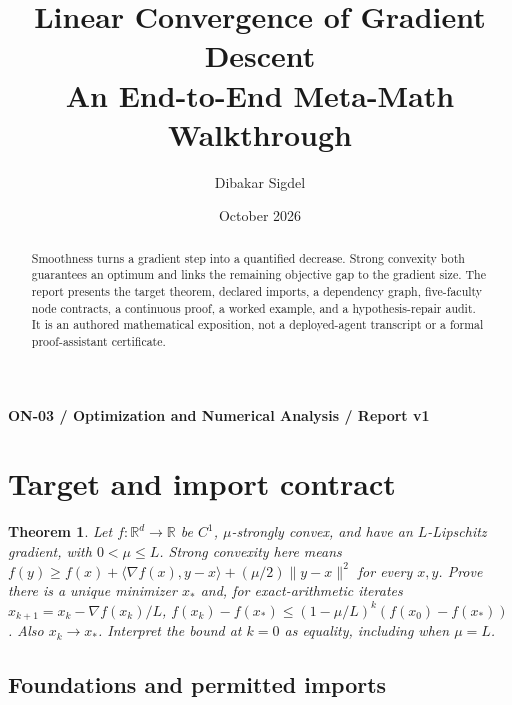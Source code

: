 \documentclass[preprint,12pt,aps,pra,showkeys,amsmath,amssymb,superscriptaddress,floatfix]{revtex4-2}
\newtheorem{theorem}{Theorem}[section]
\theoremstyle{definition}
\theoremstyle{remark}
\begin{document}
\title{Linear Convergence of Gradient Descent\\[4pt]\large An End-to-End Meta-Math Walkthrough}

\author{Dibakar Sigdel}


\date{October 2026}

\begin{abstract}

Smoothness turns a gradient step into a quantified decrease. Strong
convexity both guarantees an optimum and links the remaining objective
gap to the gradient size. The report presents the target theorem,
declared imports, a dependency graph, five-faculty node contracts, a
continuous proof, a worked example, and a hypothesis-repair audit. It is
an authored mathematical exposition, not a deployed-agent transcript or
a formal proof-assistant certificate.

\end{abstract}\maketitle\linespread{1.12}\selectfont

\noindent\textbf{ON-03 / Optimization and Numerical Analysis / Report v1}

\section{Target and import contract}

\begin{theorem}

Let \(f:\mathbb R^d\to\mathbb R\) be \(C^1\), \(\mu\)-strongly convex,
and have an \(L\)-Lipschitz gradient, with \(0<\mu\le L\). Strong
convexity here means
\(f(y)\ge f(x)+\langle\nabla f(x),y-x\rangle+(\mu/2)\|y-x\|^2\) for
every \(x,y\). Prove there is a unique minimizer \(x_*\) and, for
exact-arithmetic iterates \(x_{k+1}=x_k-\nabla f(x_k)/L\),
\(f(x_k)-f(x_*)\le(1-\mu/L)^k(f(x_0)-f(x_*))\). Also \(x_k\to x_*\).
Interpret the bound at \(k=0\) as equality, including when \(\mu=L\).

\end{theorem}

\subsection{Foundations and permitted imports}
\end{document}
